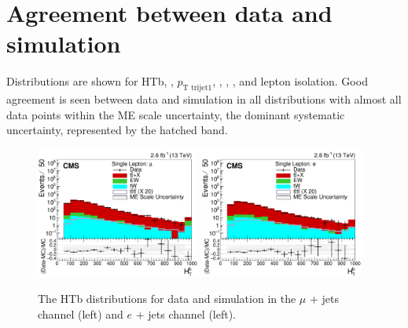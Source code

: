 \section{Agreement between data and simulation}
Distributions are shown for HTb, \HTrat, $p_{\textrm{T trijet1}}$, \nLtags, \nTtags, \redhadmass, \HTX and lepton isolation. Good agreement is seen between data and simulation in all distributions with almost all data points within the ME scale uncertainty, the dominant systematic uncertainty, represented by the hatched band.

\begin{figure}[ht!]
    \includegraphics[width=0.48\textwidth]{images/Run2/HTb_StackLogY.pdf}
    \includegraphics[width=0.48\textwidth]{images/Run2/HTb_StackLogY_e.pdf}
    \caption{The HTb distributions for data and simulation in the $\mu$ + jets channel (left) and $e$ + jets channel (left).}
    \label{fig:HTB}
\end{figure}


